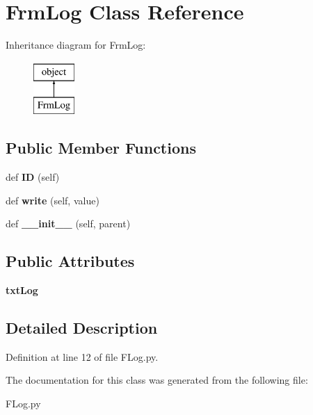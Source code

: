 \hypertarget{class_f_log_1_1_frm_log}{}\section{Frm\+Log Class Reference}
\label{class_f_log_1_1_frm_log}
Inheritance diagram for Frm\+Log\+:\begin{figure}[H]
\begin{center}
\leavevmode
\includegraphics[height=2.000000cm]{class_f_log_1_1_frm_log}
\end{center}
\end{figure}
\subsection*{Public Member Functions}
\begin{DoxyCompactItemize}
\item 
\mbox{\label{class_f_log_1_1_frm_log_adb8818239148d2e5c5833a2b062ee9ad}} 
def {\bfseries ID} (self)
\item 
\mbox{\label{class_f_log_1_1_frm_log_a9e7a6618d4b693eb2dab68e2f34a7886}} 
def {\bfseries write} (self, value)
\item 
\mbox{\label{class_f_log_1_1_frm_log_a75020e7f3888d6f837fae592b305add8}} 
def {\bfseries \+\_\+\+\_\+init\+\_\+\+\_\+} (self, parent)
\end{DoxyCompactItemize}
\subsection*{Public Attributes}
\begin{DoxyCompactItemize}
\item 
\mbox{\label{class_f_log_1_1_frm_log_a06feb554f3bbbe630438139278982556}} 
{\bfseries txt\+Log}
\end{DoxyCompactItemize}


\subsection{Detailed Description}


Definition at line 12 of file F\+Log.\+py.



The documentation for this class was generated from the following file\+:\begin{DoxyCompactItemize}
\item 
F\+Log.\+py\end{DoxyCompactItemize}
